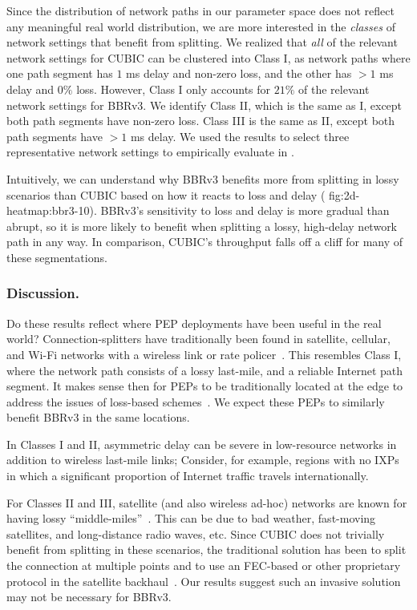 

Since the distribution of network paths in our parameter space does not reflect
any meaningful real world distribution, we are more interested in the \textit
{classes} of network settings that benefit from splitting. We realized
that \textit{all} of the relevant network settings for CUBIC can be clustered
into Class I, as network paths where one path segment has $1$ ms delay and
non-zero loss, and the other has $>1$ ms delay and $0\%$ loss. However, Class
I only accounts for $21\%$ of the relevant network settings for BBRv3. We
identify Class II, which is the same as I, except both path segments have
non-zero loss. Class III is the same as II, except both path segments have
$>1$ ms delay. We used the results to select three representative network
settings to empirically evaluate in .

Intuitively, we can understand why BBRv3 benefits more from splitting in lossy
scenarios than CUBIC based on how it reacts to loss and delay (\Cref
{fig:2d-heatmap:bbr3-10}). BBRv3's sensitivity to loss
and delay is more gradual than abrupt, so it is more likely to benefit when
splitting a lossy, high-delay network path in any way. In comparison, CUBIC's
throughput falls off a cliff for many of these segmentations.

\subsubsection{Discussion.}
Do these results reflect where PEP deployments have been useful in the real
world? Connection-splitters have traditionally been found in satellite,
cellular, and Wi-Fi networks with a wireless link or rate policer~\cite
{edeline2019bottomup,honda2011still}. This resembles Class I, where the
network path consists of a lossy last-mile, and a reliable Internet path
segment. It makes sense then for PEPs to be traditionally located at the edge
to address the issues of loss-based schemes~\cite
{cloudsplitting2010,rfc3135,farkas2012splittcp}. We expect these PEPs to
similarly benefit BBRv3 in the same locations.

In Classes I and II, asymmetric delay can be severe in low-resource networks
in addition to wireless last-mile links;
Consider, for example, regions with no IXPs in which a significant proportion
of Internet traffic travels internationally.

For Classes II and III, satellite (and also wireless ad-hoc)
networks are known for
having lossy ``middle-miles''~\cite{kuhn2021quic-over-sat,border2020evaluating,pirovano2013new,cloudsplitting2010}.
This can be due to bad weather, fast-moving satellites, and
long-distance radio waves, etc.
Since CUBIC does not trivially benefit from splitting in these scenarios, the
traditional solution has been to split the connection at multiple points and to
use an FEC-based or other proprietary protocol in the satellite backhaul~\cite
{cloudsplitting2010,border2020evaluating,rfc3135}.
Our results suggest such an invasive solution may not be necessary for BBRv3.

